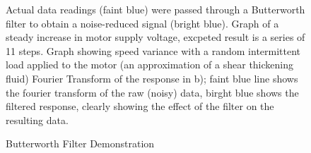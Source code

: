 \documentclass[twoside,a4]{report}
\begin{document}
\begin{figure}[!htb]
	{\centering
	\caption{Butterworth Filter Demonstration}
	\label{figfilterdemon}}
	{\footnotesize Actual data readings (faint blue) were passed through a Butterworth filter to obtain a noise-reduced signal (bright blue). Graph of a steady increase in motor supply voltage, excpeted result is a series of 11 steps. Graph showing speed variance with a random intermittent load applied to the motor (an approximation of a shear thickening fluid) Fourier Transform of the response in b); faint blue line shows the fourier transform of the raw (noisy) data, birght blue shows the filtered response, clearly showing the effect of the filter on the resulting data.}
\end{figure}
\end{document}
